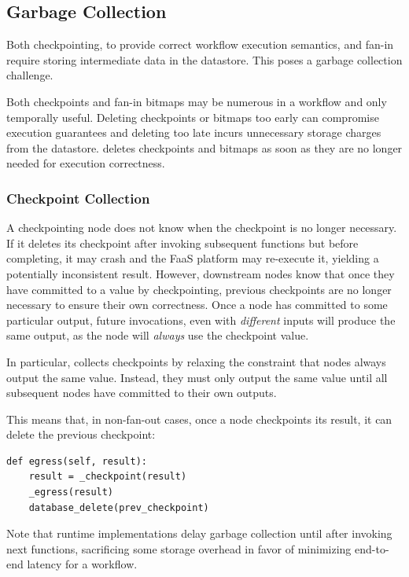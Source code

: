\subsection{Garbage Collection}\label{sec:design:garbage}

Both checkpointing, to provide correct workflow execution semantics, and fan-in
require storing intermediate data in the datastore. This poses a garbage
collection challenge.

Both checkpoints and fan-in bitmaps may be numerous in a workflow and only
temporally useful. Deleting checkpoints or bitmaps too early can compromise
execution guarantees and deleting too late incurs unnecessary storage charges
from the datastore. \name{} deletes checkpoints and bitmaps as soon as they are
no longer needed for execution correctness.

\subsubsection{Checkpoint Collection}

A checkpointing node does not know when the checkpoint is no longer necessary.
If it deletes its checkpoint after invoking subsequent functions but before
completing, it may crash and the FaaS platform may re-execute it, yielding a
potentially inconsistent result. However, downstream nodes know that once they
have committed to a value by checkpointing, previous checkpoints are no longer
necessary to ensure their own correctness. Once a node has committed to some
particular output, future invocations, even with \emph{different} inputs will produce the same output, as the node will \emph{always} use the checkpoint value.

In particular, \name{} collects checkpoints by relaxing the constraint that
nodes always output the same value. Instead, they must only output the same
value until all subsequent nodes have committed to their own outputs.

This means that, in non-fan-out cases, once a node checkpoints its result, it
can delete the previous checkpoint:

\begin{verbatim}
def egress(self, result):
    result = _checkpoint(result)
    _egress(result)
    database_delete(prev_checkpoint)
\end{verbatim}

Note that \name{} runtime implementations delay garbage collection until after
invoking next functions, sacrificing some storage overhead in favor of
minimizing end-to-end latency for a workflow.

